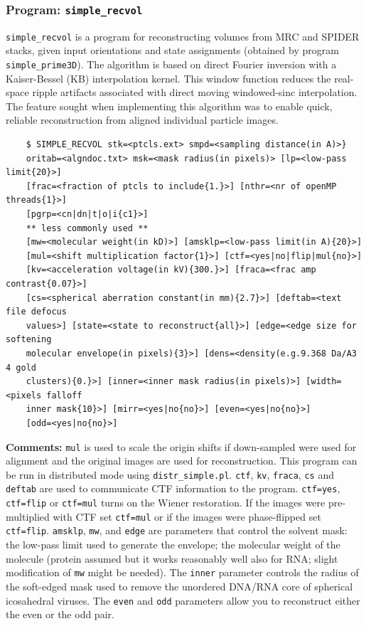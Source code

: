 \documentclass[a4paper,11pt]{article}
\newcommand{\prgname}[1]{\textcolor{NavyBlue}{\texttt{#1}}}
\begin{document}
\subsubsection{Program: \prgname{simple\_recvol}}
\label{recvol}
\prgname{simple\_recvol} is a program for reconstructing volumes from MRC and SPIDER stacks, given input orientations and state assignments (obtained by program \prgname{simple\_prime3D}). The algorithm is based on direct Fourier inversion with a Kaiser-Bessel (KB) interpolation kernel. This window function reduces the real-space ripple artifacts associated with direct moving windowed-sinc interpolation. The feature sought when implementing this algorithm was to enable quick, reliable reconstruction from aligned individual particle images.
\begin{verbatim}
    $ SIMPLE_RECVOL stk=<ptcls.ext> smpd=<sampling distance(in A)>}
    oritab=<algndoc.txt> msk=<mask radius(in pixels)> [lp=<low-pass limit{20}>]
    [frac=<fraction of ptcls to include{1.}>] [nthr=<nr of openMP threads{1}>]
    [pgrp=<cn|dn|t|o|i{c1}>]
    ** less commonly used **
    [mw=<molecular weight(in kD)>] [amsklp=<low-pass limit(in A){20}>]
    [mul=<shift multiplication factor{1}>] [ctf=<yes|no|flip|mul{no}>]
    [kv=<acceleration voltage(in kV){300.}>] [fraca=<frac amp contrast{0.07}>]
    [cs=<spherical aberration constant(in mm){2.7}>] [deftab=<text file defocus
    values>] [state=<state to reconstruct{all}>] [edge=<edge size for softening
    molecular envelope(in pixels){3}>] [dens=<density(e.g.9.368 Da/A3 4 gold
    clusters){0.}>] [inner=<inner mask radius(in pixels)>] [width=<pixels falloff
    inner mask{10}>] [mirr=<yes|no{no}>] [even=<yes|no{no}>]
    [odd=<yes|no{no}>]
\end{verbatim}
\noindent\textbf{Comments:} \texttt{mul} is used to scale the origin shifts if down-sampled were used for alignment and the original images are used for reconstruction. This program can be run in distributed mode using \prgname{distr\_simple.pl}. \texttt{ctf}, \texttt{kv}, \texttt{fraca}, \texttt{cs} and \texttt{deftab} are used to communicate CTF information to the program. \texttt{ctf=yes}, \texttt{ctf=flip} or \texttt{ctf=mul} turns on the Wiener restoration. If the images were pre-multiplied with CTF set \texttt{ctf=mul} or if the images were phase-flipped set \texttt{ctf=flip}. \texttt{amsklp}, \texttt{mw}, and \texttt{edge} are parameters that control the solvent mask: the low-pass limit used to generate the envelope; the molecular weight of the molecule (protein assumed but it works reasonably well also for RNA; slight modification of \texttt{mw} might be needed). The \texttt{inner} parameter controls the radius of the soft-edged mask used to remove the unordered DNA/RNA core of spherical icosahedral viruses. The \texttt{even} and \texttt{odd} parameters allow you to reconstruct either the even or the odd pair.
\end{document}
